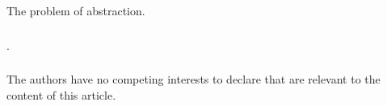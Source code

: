 \documentclass[runningheads]{llncs}
\begin{document}
The problem of abstraction. 


\begin{credits}
\subsubsection{\ackname} .

\subsubsection{\discintname}
The authors have no competing interests to declare that are
relevant to the content of this article.
\end{credits}
%
%
%


%
\end{document}
